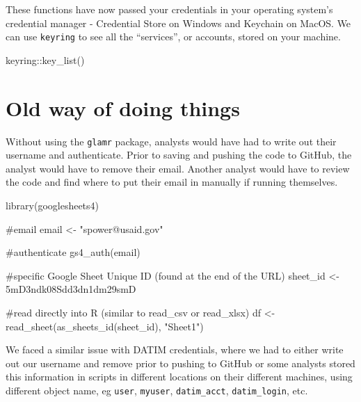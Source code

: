 \documentclass[
  letterpaper,
  DIV=11,
  numbers=noendperiod]{scrreprt}
\newenvironment{Shaded}{\begin{snugshade}}{\end{snugshade}}
\newcommand{\CommentTok}[1]{\textcolor[rgb]{0.37,0.37,0.37}{#1}}
\newcommand{\FunctionTok}[1]{\textcolor[rgb]{0.28,0.35,0.67}{#1}}
\newcommand{\NormalTok}[1]{\textcolor[rgb]{0.00,0.23,0.31}{#1}}
\newcommand{\OtherTok}[1]{\textcolor[rgb]{0.00,0.23,0.31}{#1}}
\newcommand{\SpecialCharTok}[1]{\textcolor[rgb]{0.37,0.37,0.37}{#1}}
\newcommand{\StringTok}[1]{\textcolor[rgb]{0.13,0.47,0.30}{#1}}
\begin{document}
These functions have now passed your credentials in your operating
system's credential manager - Credential Store on Windows and Keychain
on MacOS. We can use \texttt{keyring} to see all the ``services'', or
accounts, stored on your machine.

\begin{Shaded}
\begin{Highlighting}[]
\NormalTok{keyring}\SpecialCharTok{::}\FunctionTok{key\_list}\NormalTok{()}
\end{Highlighting}
\end{Shaded}

\hypertarget{old-way-of-doing-things}{%
\section{Old way of doing things}\label{old-way-of-doing-things}}

Without using the \texttt{glamr} package, analysts would have had to
write out their username and authenticate. Prior to saving and pushing
the code to GitHub, the analyst would have to remove their email.
Another analyst would have to review the code and find where to put
their email in manually if running themselves.

\begin{Shaded}
\begin{Highlighting}[]
\FunctionTok{library}\NormalTok{(googlesheets4)}

\CommentTok{\#email}
\NormalTok{  email }\OtherTok{\textless{}{-}} \StringTok{"spower@usaid.gov"} 

\CommentTok{\#authenticate}
  \FunctionTok{gs4\_auth}\NormalTok{(email)}

\CommentTok{\#specific Google Sheet Unique ID (found at the end of the URL)}
\NormalTok{  sheet\_id }\OtherTok{\textless{}{-}} \StringTok{\textquotesingle{}5mD3ndk08Sdd3dn1dm29smD\textquotesingle{}}
  
\CommentTok{\#read directly into R (similar to read\_csv or read\_xlsx)}
\NormalTok{  df }\OtherTok{\textless{}{-}} \FunctionTok{read\_sheet}\NormalTok{(}\FunctionTok{as\_sheets\_id}\NormalTok{(sheet\_id), }\StringTok{"Sheet1"}\NormalTok{)  }
\end{Highlighting}
\end{Shaded}

We faced a similar issue with DATIM credentials, where we had to either
write out our username and remove prior to pushing to GitHub or some
analysts stored this information in scripts in different locations on
their different machines, using different object name, eg \texttt{user},
\texttt{myuser}, \texttt{datim\_acct}, \texttt{datim\_login}, etc.
\end{document}
